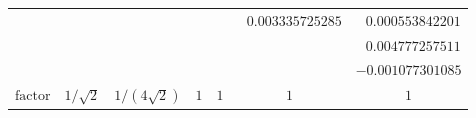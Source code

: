 \begin{table}
\begin{center}
{\begin{tabular}{c|cccccc}
		                        &              &                 &                     &                     & $~~~0.003335725285$ & $~~~0.000553842201$ \\
		                        &              &                 &                     &                     &                     & $~~~0.004777257511$ \\
		                        &              &                 &                     &                     &                     &  $-0.001077301085$  \\ \hline
		       $\text{factor}$         & $1/\sqrt{2}$ & $1/(4\sqrt{2})$ &         $1$         &         $1$         &         $1$         &         $1$         \\ \hline
	\end{tabular}}
	\end{center}
\end{table}
